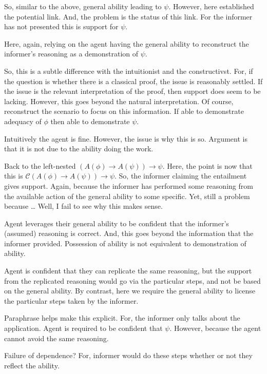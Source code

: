 \documentclass[10pt]{article}
\newcommand{\hozlinedash}[0]{%
  \noindent\hdashrule[0.5ex][c]{\textwidth}{.1pt}{2.5pt}
}
\begin{document}
So, similar to the above, general ability leading to \(\psi\).
However, here established the potential link.
And, the problem is the status of this link.
For the informer has not presented this is support for \(\psi\).

Here, again, relying on the agent having the general ability to reconstruct the informer's reasoning as a demonstration of \(\psi\).

So, this is a subtle difference with the intuitionist and the constructivst.
For, if the question is whether there is a classical proof, the issue is reasonably settled.
If the issue is the relevant interpretation of the proof, then support does seem to be lacking.
However, this goes beyond the natural interpretation.
Of course, reconstruct the scenario to focus on this information.
If able to demonstrate adequacy of \(\phi\) then able to demonstrate \(\psi\).

Intuitively the agent is fine.
However, the issue is why this is so.
Argument is that it is not due to the ability doing the work.

\hozlinedash

Back to the left-nested \((A(\phi) \rightarrow A(\psi)) \rightarrow \psi\).
Here, the point is now that this is \(\mathcal{C}(A(\phi) \rightarrow A(\psi)) \rightarrow \psi\).
So, the informer claiming the entailment gives support.
Again, because the informer has performed some reasoning from the available action of the general ability to some specific.
Yet, still a problem because \dots
Well, I fail to see why this makes sense.

\hozlinedash

Agent leverages their general ability to be confident that the informer's (assumed) reasoning is correct.
And, this goes beyond the information that the informer provided.
Possession of ability is not equivalent to demonstration of ability.

Agent is confident that they can replicate the same reasoning, but the support from the replicated reasoning would go via the particular steps, and not be based on the general ability.
By contrast, here we require the general ability to license the particular steps taken by the informer.

Paraphrase helps make this explicit.
For, the informer only talks about the application.
Agent is required to be confident that \(\psi\).
However, because the agent cannot avoid the same reasoning.

Failure of dependence?
For, informer would do these steps whether or not they reflect the ability.
\end{document}
